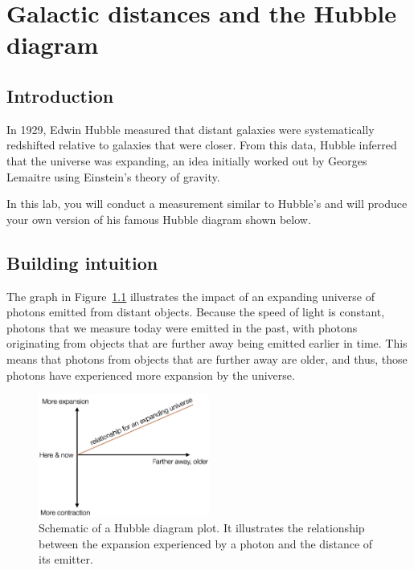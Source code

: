 \chapter{Galactic distances and the Hubble diagram}



\section{Introduction}

In 1929, Edwin Hubble measured that distant galaxies were
systematically redshifted relative to galaxies that were closer. From this
data, Hubble inferred that the universe was expanding, an idea initially
worked out by Georges Lemaitre using Einstein's theory of gravity.

In this lab, you will conduct a measurement similar to Hubble's and will
produce your own version of his famous Hubble diagram shown below.

\section{Building intuition}

The graph in Figure~\ref{hd:fig:hubble-diagram-schematic} illustrates the impact of an expanding universe of
photons emitted from distant objects. Because the speed of light is
constant, photons that we measure today were emitted in the past, with
photons originating from objects that are further away being emitted
earlier in time. This means that photons from objects that are further
away are older, and thus, those photons have experienced more expansion by the universe.

\begin{figure}
	\centering
	\includegraphics[width=0.5\textwidth]{hubble-diagram/hubble-diagram-schematic}
	\caption{Schematic of a Hubble diagram plot. It illustrates the relationship between the expansion
		experienced by a photon and the distance of its emitter.}\label{hd:fig:hubble-diagram-schematic}
\end{figure}


